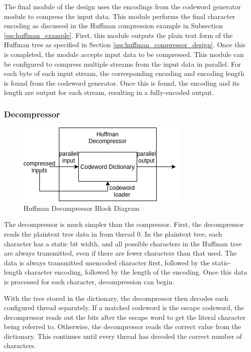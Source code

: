 \documentclass[doublespace,nopageskip]{VTthesis}
\begin{document}
The final module of the design uses the encodings from the codeword generator module to compress the input data. This module performs the final character encoding as discussed in the Huffman compression example in Subsection \ref{sss:huffman_example}. First, this module outputs the plain text form of the Huffman tree as specified in Section \ref{sss:huffman_compressor_design}. Once this is completed, the module accepts input data to be compressed. This module can be configured to compress multiple streams from the input data in parallel. For each byte of each input stream, the corresponding encoding and encoding length is found from the codeword generator. Once this is found, the encoding and its length are output for each stream, resulting in a fully-encoded output.

\subsubsection{Decompressor}\label{sss:huffman_decompressor_implementation}

\begin{figure}[htb]
	\centering
	\includegraphics[scale=1]{Huffman Decompressor Block Diagram.png}
	\caption{Huffman Decompressor Block Diagram}
	\label{fig:huffman_decompressor_block_diagram}
\end{figure}

The decompressor is much simpler than the compressor. First, the decompressor reads the plaintext tree data in from thread 0. In the plaintext tree, each character has a static bit width, and all possible characters in the Huffman tree are always transmitted, even if there are fewer characters than that used. The data is always transmitted unencoded character first, followed by the static-length character encoding, followed by the length of the encoding. Once this data is processed for each character, decompression can begin.

With the tree stored in the dictionary, the decompressor then decodes each configured thread separately. If a matched codeword is the escape codeword, the decompressor reads out the bits after the escape word to get the literal character being referred to. Otherwise, the decompressor reads the correct value from the dictionary. This continues until every thread has decoded the correct number of characters.
\end{document}
